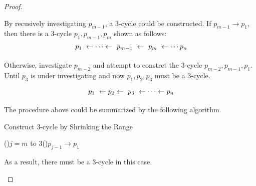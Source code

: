 \documentclass[12pt,a4paper]{article}
\theoremstyle{definition}
\newcommand{\tikzmark}[3][]
  {\tikz[remember picture, baseline]
    \node [anchor=base,#1](#2) {#3};}
\begin{document}
\begin{enumerate}
\begin{proof}
\begin{description}
        By recusively investigating $p_{m-1}$, a 3-cycle could be constructed. If $p_{m-1}\rightarrow p_1$, then there is a 3-cycle $p_1,p_{m-1},p_m$ shown as follows:
        \begin{equation*}
            \tikzmark{one}{$p_1$}\leftarrow \cdots \leftarrow \tikzmark{minus}{$p_{m-1}$}\leftarrow \tikzmark{control}{$p_m$} \leftarrow \cdots p_n
        \end{equation*}


        Otherwise, investigate $p_{m-2}$ and attempt to constrct the 3-cycle $p_{m-2},p_{m-1},p_1$. Until $p_3$ is under investigating and now $p_1,p_2,p_3$ must be a 3-cycle.
        
        \begin{equation*}
            \tikzmark{onen}{$p_1$}\leftarrow p_2\leftarrow \tikzmark{threen}{$p_3$}\leftarrow \cdots \leftarrow p_n
        \end{equation*}


        The procedure above could be summarized by the following algorithm.

        \begin{minipage}{0.88\textwidth}
            \begin{algorithm}[H]
                \BlankLine
                \caption{Construct 3-cycle by Shrinking the Range} \label{Alg-Cons}
    
                \For(){$j= m$ to $3$}{\If(){$p_{j-1}\rightarrow p_1$}{\;}}
    
                \;
            \end{algorithm}    
            \end{minipage}

        As a result, there must be a 3-cycle in this case.


\end{description}
\end{proof}
\end{enumerate}
\end{document}
